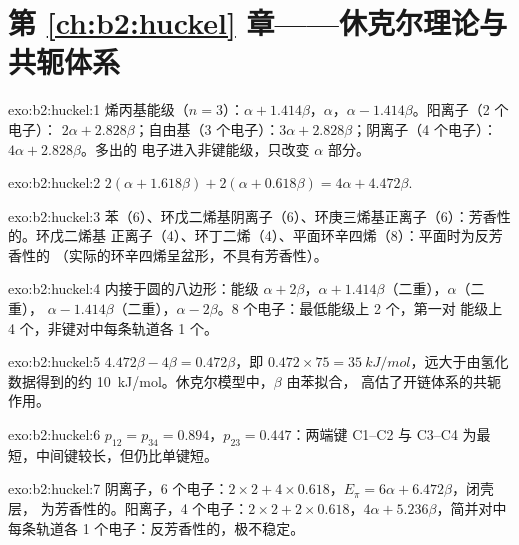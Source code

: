 \section*{第 \ref{ch:b2:huckel} 章——休克尔理论与共轭体系}

\begin{solution}{exo:b2:huckel:1}
烯丙基能级（$n = 3$）：$\alpha + 1.414\beta$，$\alpha$，$\alpha - 1.414\beta$。阳离子（2 个电子）：
$2\alpha + 2.828\beta$；自由基（3 个电子）：$3\alpha + 2.828\beta$；阴离子（4 个电子）：$4\alpha + 2.828\beta$。多出的
电子进入非键能级，只改变 $\alpha$ 部分。
\end{solution}

\begin{solution}{exo:b2:huckel:2}
$2(\alpha + 1.618\beta) + 2(\alpha + 0.618\beta) = 4\alpha + 4.472\beta$.
\end{solution}

\begin{solution}{exo:b2:huckel:3}
苯（6）、环戊二烯基阴离子（6）、环庚三烯基正离子（6）：芳香性的。环戊二烯基
正离子（4）、环丁二烯（4）、平面环辛四烯（8）：平面时为反芳香性的
（实际的环辛四烯呈盆形，不具有芳香性）。
\end{solution}

\begin{solution}{exo:b2:huckel:4}
内接于圆的八边形：能级 $\alpha + 2\beta$，$\alpha + 1.414\beta$（二重），$\alpha$（二重），
$\alpha - 1.414\beta$（二重），$\alpha - 2\beta$。8 个电子：最低能级上 2 个，第一对
能级上 4 个，非键对中每条轨道各 1 个。
\end{solution}

\begin{solution}{exo:b2:huckel:5}
$4.472\beta - 4\beta = 0.472\beta$，即 $0.472 \times 75 = \qty{35}{kJ/mol}$，远大于由氢化数据得到的约
\qty{10}{kJ/mol}。休克尔模型中，$\beta$ 由苯拟合，
高估了开链体系的共轭作用。
\end{solution}

\begin{solution}{exo:b2:huckel:6}
$p_{12} = p_{34} = 0.894$，$p_{23} = 0.447$：两端键 C1--C2 与 C3--C4 为最
短，中间键较长，但仍比单键短。
\end{solution}

\begin{solution}{exo:b2:huckel:7}
阴离子，6 个电子：$2 \times 2 + 4 \times 0.618$，$E_\pi = 6\alpha + 6.472\beta$，闭壳层，
为芳香性的。阳离子，4 个电子：$2 \times 2 + 2 \times 0.618$，$4\alpha + 5.236\beta$，简并对中
每条轨道各 1 个电子：反芳香性的，极不稳定。
\end{solution}

